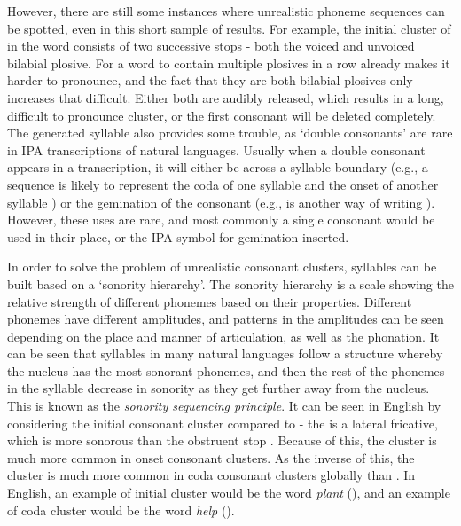 \documentclass{report}
\begin{document}
	However, there are still some instances where unrealistic phoneme sequences can be spotted, even in this short sample of results. For example, the initial cluster of  in the word  consists of two successive stops - both the voiced and unvoiced bilabial plosive. For a word to contain multiple plosives in a row already makes it harder to pronounce, and the fact that they are both bilabial plosives only increases that difficult. Either both are audibly released, which results in a long, difficult to pronounce cluster, or the first consonant will be deleted completely. The generated syllable  also provides some trouble, as `double consonants' are rare in IPA transcriptions of natural languages. Usually when a double consonant appears in a transcription, it will either be across a syllable boundary (e.g., a sequence  is likely to represent the coda of one syllable and the onset of another syllable ) or the gemination of the consonant (e.g.,  is another way of writing ). However, these uses are rare, and most commonly a single consonant would be used in their place, or the IPA symbol for gemination inserted.
	
	In order to solve the problem of unrealistic consonant clusters, syllables can be built based on a `sonority hierarchy'. The sonority hierarchy is a scale showing the relative strength of different phonemes based on their properties\cite{burquest2006}. Different phonemes have different amplitudes, and patterns in the amplitudes can be seen depending on the place and manner of articulation, as well as the phonation. It can be seen that syllables in many natural languages follow a structure whereby the nucleus has the most sonorant phonemes, and then the rest of the phonemes in the syllable decrease in sonority as they get further away from the nucleus. This is known as the \textit{sonority sequencing principle}. It can be seen in English by considering the initial consonant cluster  compared to  - the  is a lateral fricative, which is more sonorous than the obstruent stop . Because of this, the cluster  is much more common in onset consonant clusters. As the inverse of this, the cluster  is much more common in coda consonant clusters globally than . In English, an example of initial cluster  would be the word \textit{plant} (), and an example of coda cluster  would be the word \textit{help} ().
	
\end{document}
